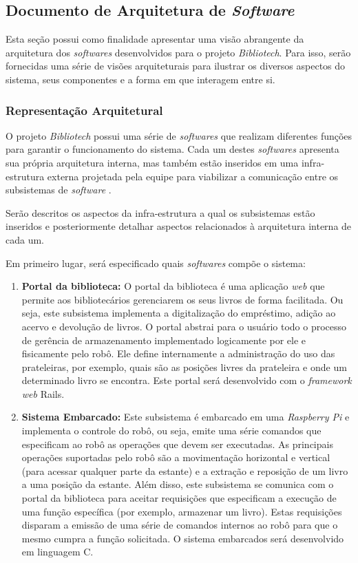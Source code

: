 \subsection[Documento de Arquitetura de Software]{Documento de Arquitetura de \textit{Software}}
Esta seção possui como finalidade apresentar uma visão abrangente da arquitetura dos \textit{softwares} desenvolvidos para o projeto \textit{Bibliotech}. Para isso, serão fornecidas uma série de visões arquiteturais para ilustrar os diversos aspectos do sistema, seus componentes e a forma em que interagem entre si.

\subsubsection{Representação Arquitetural}
O projeto \textit{Bibliotech} possui uma série de \textit{softwares} que realizam diferentes funções para garantir o funcionamento do sistema. Cada um destes \textit{softwares} apresenta sua própria arquitetura interna, mas também estão inseridos em uma infra-estrutura externa projetada pela equipe para viabilizar a comunicação entre os subsistemas de \textit{software} . 

Serão descritos os aspectos da infra-estrutura a qual os subsistemas estão inseridos e posteriormente detalhar aspectos relacionados à arquitetura interna de cada um.

Em primeiro lugar, será especificado quais \textit{softwares} compõe o sistema:

\begin{enumerate}
    \item\textbf{Portal da biblioteca:} O portal da biblioteca é uma aplicação \textit{web} que permite aos bibliotecários gerenciarem os seus livros de forma facilitada. Ou seja, este subsistema implementa a digitalização do empréstimo, adição ao acervo e devolução de livros. O portal abstrai para o usuário todo o processo de gerência de armazenamento implementado logicamente por ele e fisicamente pelo robô. Ele define internamente a administração do uso das prateleiras, por exemplo, quais são as posições livres da prateleira e onde um determinado livro se encontra. Este portal será desenvolvido com o \textit{framework} \textit{web} Rails.

    \item\textbf{Sistema Embarcado:} Este subsistema é embarcado em uma \textit{Raspberry Pi} e implementa o controle do robô, ou seja, emite uma série comandos que especificam ao robô as operações que devem ser executadas. As principais operações suportadas pelo robô são a movimentação horizontal e vertical (para acessar qualquer parte da estante) e a extração e reposição de um livro a uma posição da estante. Além disso, este subsistema se comunica com o portal da biblioteca para aceitar requisições que especificam a execução de uma função específica (por exemplo, armazenar um livro). Estas requisições disparam a emissão de uma série de comandos internos ao robô para que o mesmo cumpra a função solicitada. O sistema embarcados será desenvolvido em linguagem C.
\end{enumerate}

